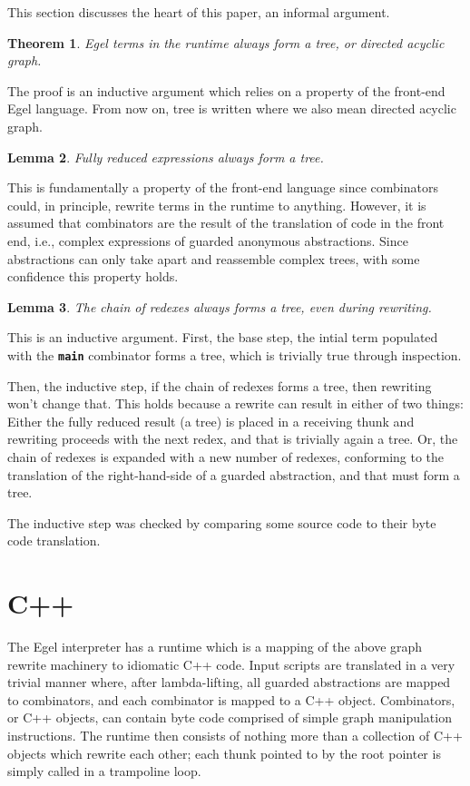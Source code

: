 \documentclass{research4cacm}
\newcommand{\code}[1]{{\bf\texttt{#1}}}
\newtheorem{theorem}{Theorem}[section]
\newtheorem{lemma}[theorem]{Lemma}
\begin{document}
This section discusses the heart of this paper, an informal
argument.

\begin{theorem}
Egel terms in the runtime always form a tree, or directed
acyclic graph.
\end{theorem}

The proof is an inductive argument which relies on a
property of the front-end Egel language. From now on,
tree is written where we also mean directed acyclic graph.

\begin{lemma}
Fully reduced expressions always form a tree.
\end{lemma}

This is fundamentally a property of the front-end
language since combinators could, in principle, rewrite
terms in the runtime to anything. However, it is assumed
that combinators are the result of the translation of 
code in the front end, i.e., complex expressions of 
guarded anonymous abstractions. Since abstractions can
only take apart and reassemble complex trees, with
some confidence this property holds. 

\begin{lemma}
The chain of redexes always forms a tree, even during rewriting.
\end{lemma}

This is an inductive argument. First, the base step, the intial term
populated with the \code{main} combinator forms a tree, 
which is trivially true through inspection.

Then, the inductive step, if the chain of redexes forms a tree,
then rewriting won't change that. This holds because a rewrite
can result in either of two things: Either the fully
reduced result (a tree) is placed in a receiving thunk and
rewriting proceeds with the next redex, and that is trivially
again a tree. Or, the chain of redexes is expanded with a new number 
of redexes, conforming to the translation of the right-hand-side of
a guarded abstraction, and that must form a tree.

The inductive step was checked by comparing some source code to
their byte code translation.

\section{C++}

The Egel interpreter has a runtime which is a mapping of the above
graph rewrite machinery to idiomatic C++ code. Input
scripts are translated in a very trivial manner where,
after lambda-lifting, all guarded abstractions are mapped
to combinators, and each combinator is mapped to a C++
object. Combinators, or C++ objects, can contain byte
code comprised of simple graph manipulation instructions.
The runtime then consists of nothing more than a
collection of C++ objects which rewrite each other;
each thunk pointed to by the root pointer is 
simply called in a trampoline loop.
\end{document}
